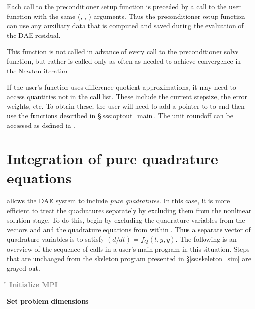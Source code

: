 {{  Each call to the preconditioner setup function is preceded by a call to the
   user function with the same (, , ) arguments.  
  Thus the preconditioner setup function can use any auxiliary data that is 
  computed and saved during the evaluation of the DAE residual.
  
  This function is not called in advance of every call to the preconditioner solve
  function, but rather is called only as often as needed to achieve convergence in
  the Newton iteration.

  If the user's  function uses difference quotient
  approximations, it may need to access quantities not in the call
  list. These include the current stepsize, the error weights, etc.
  To obtain these, the user will need to add a pointer to  
  to  and then use the  functions described in
  \S\ref{sss:optout_main}. The unit roundoff can be accessed as
   defined in .
}


\section{Integration of pure quadrature equations}

{\idas} allows the DAE system to include {\em pure quadratures}.  In
this case, it is more efficient to treat the quadratures separately by
excluding them from the nonlinear solution stage.  To do this, begin
by excluding the quadrature variables from the vectors  and
 and the quadrature equations from within .  Thus a
separate vector  of quadrature variables is to satisfy
$(d/dt)$ = $f_Q(t,y,\dot{y})$.  The following is an overview of the
sequence of calls in a user's main program in this situation. Steps
that are unchanged from the skeleton program presented in
\S\ref{ss:skeleton_sim} are grayed out.

\begin{Steps}
  
\item 
  \textcolor{gray}{\bf {\p} {\h} Initialize MPI}

\item
  {\bf Set problem dimensions}


\end{Steps}}
